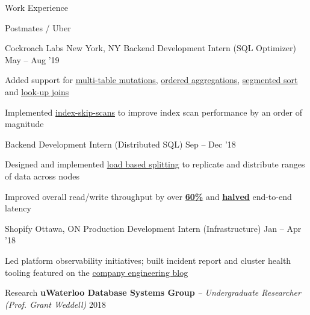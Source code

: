 \documentclass{resume} %
\begin{document}
\begin{rSection}{Work Experience}
\begin{rWorkSection}{Postmates / Uber}
{    }
  \end{rWorkSection}
  \begin{rDualWorkSection}{Cockroach Labs}
         {New York, NY}
         {Backend Development Intern (SQL Optimizer)}
         {May -- Aug '19}
    {
       \item Added support for  
         \href{https://github.com/cockroachdb/cockroach/pull/38452}{\ul{multi-table
           mutations}}, 
         \href{https://github.com/cockroachdb/cockroach/pull/38452}{\underline{ordered
           aggregations}}, 
         \href{https://github.com/cockroachdb/cockroach/pull/38452}{\underline{segmented
             sort}} and 
         \href{https://github.com/cockroachdb/cockroach/pull/38285}{\underline{look-up
           joins}}
       \item Implemented
         \href{https://github.com/cockroachdb/cockroach/pull/39668}{\ul{index-skip-scans}}
         to improve index scan performance by an order of magnitude
    }
    {Backend Development Intern (Distributed SQL)}
    {Sep -- Dec '18}
    {
       \item Designed and implemented \href{https://github.com/cockroachdb/cockroach/pull/31413}
      {\underline{load based splitting}} to replicate
      and distribute ranges of data across nodes
    \item Improved overall read/write throughput by over
         \setul{4pt}{.4pt}
         \href{https://github.com/cockroachdb/cockroach/issues/31819}{\textbf{\ul{60\%}}}
         and
         \href{https://github.com/cockroachdb/cockroach/issues/31819}{\textbf{\ul{halved}}}
         end-to-end latency
    }
  \end{rDualWorkSection}

  \begin{rWorkSection}{Shopify}
		     {Ottawa, ON}
		     {Production Development Intern (Infrastructure)}
		     {Jan -- Apr '18}
    {
      \item Led platform observability initiatives; built incident report and cluster health tooling
        featured on the
        \href{https://engineering.shopify.com/blogs/engineering/implementing-chatops-into-our-incident-management-procedure}
        {\underline{company engineering blog}}
    }
  \end{rWorkSection}

\end{rSection} 



\begin{rSection}{Research}
  {\bf uWaterloo Database Systems Group} {\em -- Undergraduate Researcher (Prof. Grant Weddell)} \hfill {2018}
\end{rSection}
\end{document}
